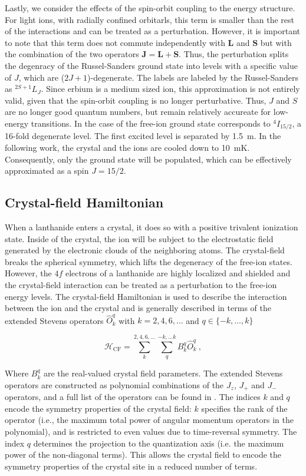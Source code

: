 Lastly, we consider the effects of the spin-orbit coupling to the energy structure. For light ions, with radially confined orbitarls, this term is smaller than the rest of the interactions and can be treated as a perturbation. However, it is important to note that this term does not commute independently with $\mathbf{L}$ and $\mathbf{S}$ but with the combination of the two operators $\mathbf{J} = \mathbf{L} + \mathbf{S}$. Thus, the perturbation splits the degenracy of the Russel-Sanders ground state into levels with a specific value of $J$, which are ($2J+1$)-degenerate. The labels are labeled by the Russel-Sanders as $^{2S+1}L_J$. Since erbium is a medium sized ion, this approximation is not entirely valid, given that the spin-orbit coupling is no longer perturbative. Thus, $J$ and $S$ are no longer good quantum numbers, but remain relatively accureate for low-energy transitions. In the case of \Er the free-ion ground state corresponds to $^4I_{15/2}$, a 16-fold degenerate level. The first excited level is separated by 1.5~\textmu m. In the following work, the \Ca crystal and the ions are cooled down to 10~mK. Consequently, only the ground state will be populated, which can be effectively approximated as a spin $J=15/2$.

\subsection{Crystal-field Hamiltonian}
When a lanthanide enters a crystal, it does so with a positive trivalent ionization state. Inside of the crystal, the ion will be subject to the electrostatic field generated by the electronic clouds of the neighboring atoms. The crystal-field breaks the spherical symmetry, which lifts the degeneracy of the free-ion states. However, the $4f$ electrons of a lanthanide are highly localized and shielded and the crystal-field interaction can be treated as a perturbation to the free-ion energy levels. The crystal-field Hamiltonian is used to describe the interaction between the ion and the crystal and is generally described in terms of the extended Stevens operators $\hat{O}^q_k$ with $k=2,4,6,\dots$ and $q \in \{-k,\dots, k\}$ \cite{abragam_electron_2012, stevens_matrix_1952}

\begin{equation}
    \mathcal{H}_{\mathrm{CF}} = \sum_{k}^{2,4,6,\dots}\sum_{q}^{-k,...k} B_k^q \hat{O}^q_k \ ,
\end{equation}

Where $B_k^q$ are the real-valued crystal field parameters. The extended Stevens operators are constructed as polynomial combinations of the $J_z$, $J_+$ and $J_-$ operators, and a full list of the operators can be found in \cite{altshuler_electron_1964}. The indices $k$ and $q$ encode the symmetry properties of the crystal field: $k$ specifies the rank of the operator (i.e., the maximum total power of angular momentum operators in the polynomial), and is restricted to even values due to time-reversal symmetry. The index $q$ determines the projection to the quantization axis (i.e. the maximum power of the non-diagonal terms). This allows the crystal field to encode the symmetry properties of the crystal site in a reduced number of terms. 

